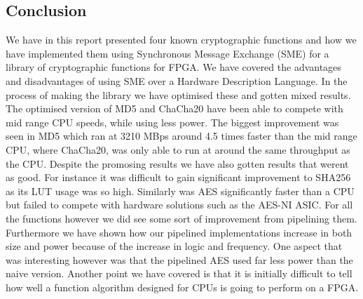 \documentclass[a4paper, openany]{memoir}
\begin{document}
\begin{abstact}
\chapter{Conclusion}
\label{sec:org03e4b55}
We have in this report presented four known cryptographic functions and how we have implemented them using Synchronous Message Exchange (SME) for a library of cryptographic functions for FPGA. We have covered the advantages and disadvantages of using SME over a Hardware Description Language. In the process of making the library we have optimised these and gotten mixed results. The optimised version of MD5 and ChaCha20 have been able to compete with mid range CPU speeds, while using less power. The biggest improvement was seen in MD5 which ran at 3210 MBps around 4.5 times faster than the mid range CPU, where ChaCha20, was only able to run at around the same throughput as the CPU. Despite the promosing results we have also gotten results that werent as good. For instance it was difficult to gain significant improvement to SHA256 as its LUT usage was so high. Similarly was AES significantly faster than a CPU but failed to compete with hardware solutions such as the AES-NI ASIC. For all the functions however we did see some sort of improvement from pipelining them. Furthermore we have shown how our pipelined implementations increase in both size and power because of the increase in logic and frequency. One aspect that was interesting however was that the pipelined AES used far less power than the naive version. Another point we have covered is that it is initially difficult to tell how well a function algorithm designed for CPUs is going to perform on a FPGA.




\begin{appendix}

\end{appendix}
\end{abstact}
\end{document}

